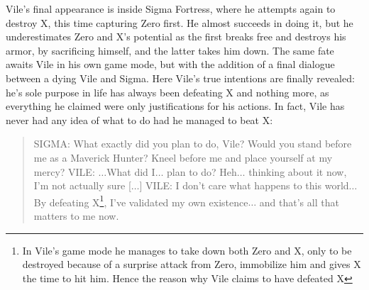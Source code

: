 Vile's final appearance is inside Sigma Fortress, where he attempts again to destroy X, this time capturing Zero first. He almost succeeds in doing it, but he underestimates Zero and X's potential as the first breaks free and destroys his armor, by sacrificing himself, and the latter takes him down. The same fate awaits Vile in his own game mode, but with the addition of a final dialogue between a dying Vile and Sigma. Here Vile's true intentions are finally revealed: he's sole purpose in life has always been defeating X and nothing more, as everything he claimed were only justifications for his actions. In fact, Vile has never had any idea of what to do had he managed to beat X:
\begin{quote}
	SIGMA: What exactly did you plan to do, Vile? Would you stand before me as a Maverick Hunter? Kneel before me and place yourself at my mercy?
	VILE: $\dots$What did I$\dots$ plan to do? Heh$\dots$ thinking about it now, I'm not actually sure
	[$\dots$]
	VILE: I don't care what happens to this world$\dots$ By defeating X\footnote{In Vile's game mode he manages to take down both Zero and X, only to be destroyed because of a surprise attack from Zero, immobilize him and gives X the time to hit him. Hence the reason why Vile claims to have defeated X}, I've validated
	my own existence$\dots$ and that's all that matters to me now.
\end{quote}

